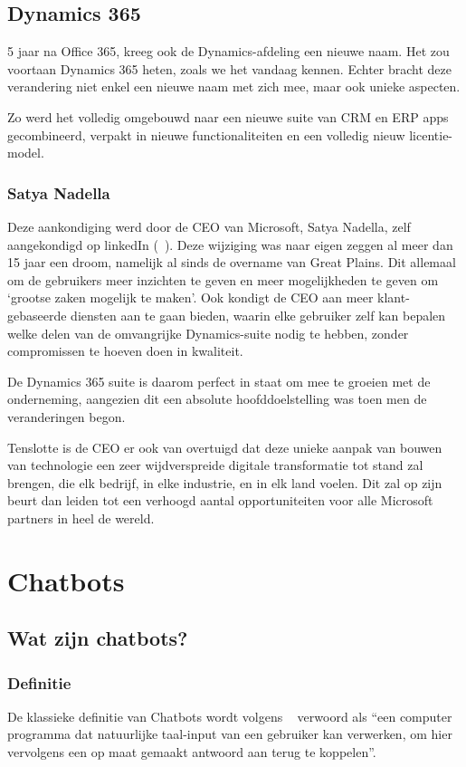 \subsection{Dynamics 365}
5 jaar na Office 365, kreeg ook de Dynamics-afdeling een nieuwe naam. Het zou voortaan Dynamics 365 heten, zoals we het vandaag kennen. Echter bracht deze verandering niet enkel een nieuwe naam met zich mee, maar ook unieke aspecten. 

Zo werd het volledig omgebouwd naar een nieuwe suite van CRM en ERP apps gecombineerd, verpakt in nieuwe functionaliteiten en een volledig nieuw licentie-model. 

\subsubsection{Satya Nadella}
Deze aankondiging werd door de CEO van Microsoft, Satya Nadella, zelf aangekondigd op linkedIn (~\cite{Nadella2016}). Deze wijziging was naar eigen zeggen al meer dan 15 jaar een droom, namelijk al sinds de overname van Great Plains. Dit allemaal om de gebruikers meer inzichten te geven en meer mogelijkheden te geven om `grootse zaken mogelijk te maken'. Ook kondigt de CEO aan meer klant-gebaseerde diensten aan te gaan bieden, waarin elke gebruiker zelf kan bepalen welke delen van de omvangrijke Dynamics-suite nodig te hebben, zonder compromissen te hoeven doen in kwaliteit. 

De Dynamics 365 suite is daarom perfect in staat om mee te groeien met de onderneming, aangezien dit een absolute hoofddoelstelling was toen men de veranderingen begon. 

Tenslotte is de CEO er ook van overtuigd dat deze unieke aanpak van bouwen van technologie een zeer wijdverspreide digitale transformatie tot stand zal brengen, die elk bedrijf, in elke industrie, en in elk land voelen. Dit zal op zijn beurt dan leiden tot een verhoogd aantal opportuniteiten voor alle Microsoft partners in heel de wereld. 


\section{Chatbots}
\subsection{Wat zijn chatbots?}
\subsubsection{Definitie}
De klassieke definitie van Chatbots wordt volgens ~\cite{Khan2017} verwoord als “een computer programma dat natuurlijke taal-input van een gebruiker kan verwerken, om hier vervolgens een op maat gemaakt antwoord aan terug te koppelen”. 

